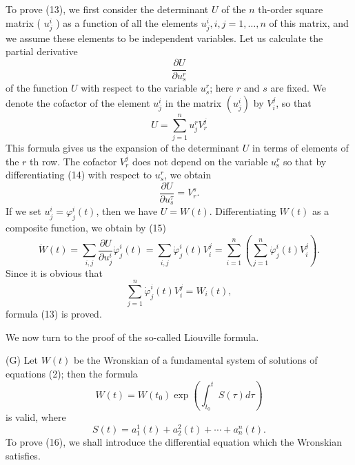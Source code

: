 \documentclass[10pt,a5paper]{book}
\theoremstyle{plain}
\theoremstyle{definition}
\theoremstyle{remark}
\begin{document}
To prove (13), we first consider the determinant $U$ of the $n$ th-order square matrix ( $u_{j}^{i}$ ) as a function of all the elements $u_{j}^{i}, i, j=1, \ldots, n$ of this matrix, and we assume these elements to be independent variables. Let us calculate the partial derivative
\[
\frac{\partial U}{\partial u_{s}^{r}}
\]
of the function $U$ with respect to the variable $u_{s}^{r}$; here $r$ and $s$ are fixed. We denote the cofactor of the element $u_{j}^{i}$ in the matrix $\left(u_{j}^{i}\right)$ by $V_{i}^{j}$, so that
\begin{equation*}
U=\sum_{j=1}^{n} u_{j}^{r} V_{r}^{j} \tag{14}
\end{equation*}
This formula gives us the expansion of the determinant $U$ in terms of elements of the $r$ th row. The cofactor $V_{r}^{j}$ does not depend on the variable $u_{\mathrm{s}}^{r}$ so that by differentiating (14) with respect to $u_{s}^{r}$, we obtain
\begin{equation*}
\frac{\partial U}{\partial u_{s}^{\tau}}=V_{r}^{s} . \tag{15}
\end{equation*}
If we set $u_{j}^{i}=\varphi_{j}^{i}(t)$, then we have $U=W(t)$. Differentiating $W(t)$ as a composite function, we obtain by (15)
\[
\dot{W}(t)=\sum_{i, j} \frac{\partial U}{\partial u_{j}^{i}} \dot{\varphi}_{j}^{i}(t)=\sum_{i, j} \dot{\varphi}_{j}^{i}(t) V_{i}^{j}=\sum_{i=1}^{n}\left(\sum_{j=1}^{n} \dot{\varphi}_{j}^{i}(t) V_{i}^{j}\right) .
\]
Since it is obvious that
\[
\sum_{j=1}^{n} \dot{\varphi}_{j}^{i}(t) V_{i}^{j}=W_{i}(t),
\]
formula (13) is proved.

We now turn to the proof of the so-called Liouville formula.

(G) Let $W(t)$ be the Wronskian of a fundamental system of solutions of equations (2); then the formula
\begin{equation*}
W(t)=W\left(t_{0}\right) \exp \left(\int_{t_{0}}^{t} S(\tau) d \tau\right) \tag{16}
\end{equation*}
is valid, where
\[
S(t)=a_{1}^{1}(t)+a_{2}^{2}(t)+\cdots+a_{n}^{n}(t) .
\]
To prove (16), we shall introduce the differential equation which the Wronskian satisfies.
\end{document}
